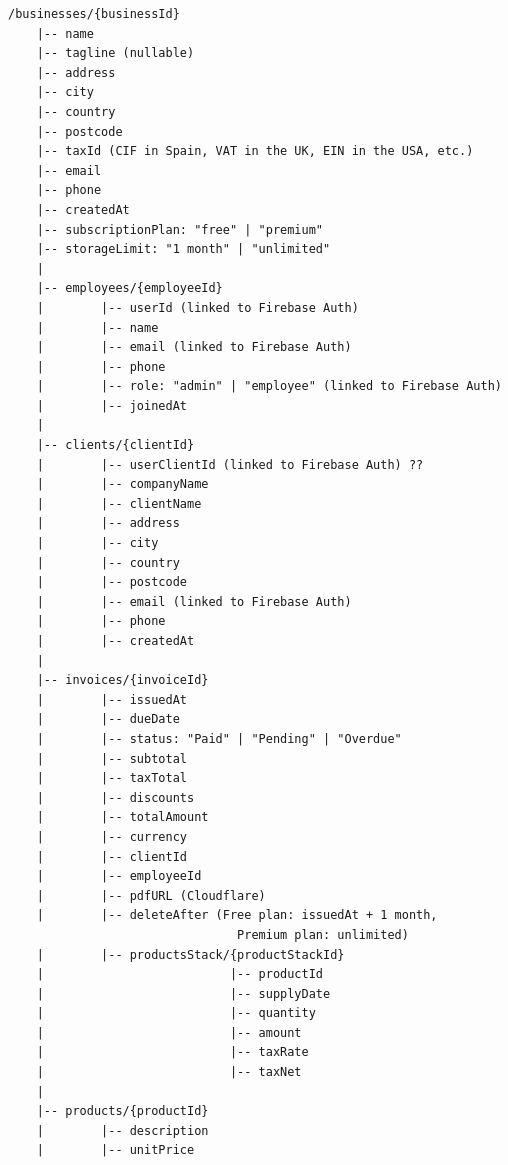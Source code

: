 \begin{large}

\begin{lstlisting}[language={},basicstyle=\ttfamily\small, caption={Modelo de datos en Firestore}]
/businesses/{businessId}
    |-- name
    |-- tagline (nullable)
    |-- address
    |-- city
    |-- country
    |-- postcode
    |-- taxId (CIF in Spain, VAT in the UK, EIN in the USA, etc.)
    |-- email
    |-- phone
    |-- createdAt
    |-- subscriptionPlan: "free" | "premium"
    |-- storageLimit: "1 month" | "unlimited"
    |
    |-- employees/{employeeId}
    |        |-- userId (linked to Firebase Auth)
    |        |-- name
    |        |-- email (linked to Firebase Auth)
    |        |-- phone
    |        |-- role: "admin" | "employee" (linked to Firebase Auth)
    |        |-- joinedAt
    |
    |-- clients/{clientId}
    |        |-- userClientId (linked to Firebase Auth) ??
    |        |-- companyName
    |        |-- clientName
    |        |-- address
    |        |-- city
    |        |-- country
    |        |-- postcode
    |        |-- email (linked to Firebase Auth)
    |        |-- phone
    |        |-- createdAt
    |
    |-- invoices/{invoiceId}
    |        |-- issuedAt
    |        |-- dueDate
    |        |-- status: "Paid" | "Pending" | "Overdue"
    |        |-- subtotal
    |        |-- taxTotal
    |        |-- discounts
    |        |-- totalAmount
    |        |-- currency
    |        |-- clientId
    |        |-- employeeId
    |        |-- pdfURL (Cloudflare)
    |        |-- deleteAfter (Free plan: issuedAt + 1 month,
                                Premium plan: unlimited)
    |        |-- productsStack/{productStackId}
    |                          |-- productId
    |                          |-- supplyDate
    |                          |-- quantity
    |                          |-- amount
    |                          |-- taxRate
    |                          |-- taxNet
    |
    |-- products/{productId}
    |        |-- description
    |        |-- unitPrice
\end{lstlisting}


\end{large}
